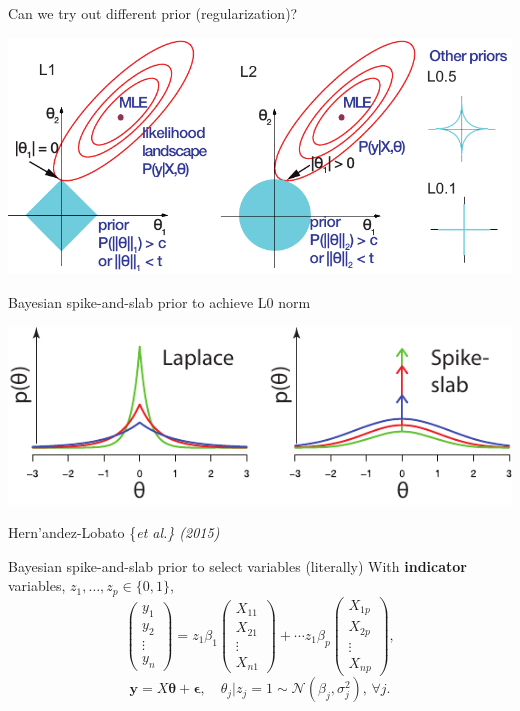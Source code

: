 \documentclass[
  ignorenonframetext,
  aspectratio=169]{beamer}
\begin{document}
\begin{frame}{Can we try out different prior (regularization)?}
\protect\hypertarget{can-we-try-out-different-prior-regularization}{}
\centerline{\includegraphics[width=.75\textwidth]{Vis/L1L2.pdf}}
\end{frame}

\begin{frame}{Bayesian spike-and-slab prior to achieve L0 norm}
\protect\hypertarget{bayesian-spike-and-slab-prior-to-achieve-l0-norm}{}
\centerline{\includegraphics[width=.75\textwidth]{Vis/SS.pdf}}

\vfill

Hern'andez-Lobato \{\it et al.\} (2015)
\end{frame}

\begin{frame}{Bayesian spike-and-slab prior to select variables
(literally)}
\protect\hypertarget{bayesian-spike-and-slab-prior-to-select-variables-literally}{}
With \textbf{indicator} variables,
\({z_{1},\ldots,z_{p} \in \{0, 1\}}\), \[\left(\begin{array}{l}
y_{1}\\
y_{2}\\
\vdots\\
y_{n}
\end{array}\right)
=
z_{1} \beta_{1} \left(\begin{array}{l}
X_{11}\\
X_{21}\\
\vdots\\
X_{n1}
\end{array}\right) +
\cdots
z_{1} \beta_{p} \left(\begin{array}{l}
X_{1p}\\
X_{2p}\\
\vdots\\
X_{np}
\end{array}\right),\]
\[\mathbf{y} = X \boldsymbol{\theta} + \boldsymbol{\epsilon},\quad
\theta_{j} | z_{j} = 1 \sim \mathcal{N}\!\left(\beta_{j}, \sigma_{j}^{2}\right),\, \forall j.\]

\vfill

\end{frame}
\end{document}
